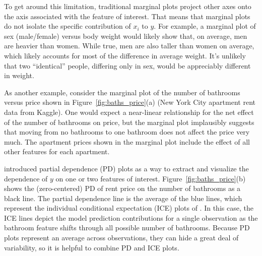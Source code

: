 \documentclass[12pt]{article}
\newcommand{\figref}[1]{Figure~\ref{#1}}
\begin{document}
To get around this limitation, traditional marginal plots project other axes onto the axis associated with the feature of interest.  That means that marginal plots do not isolate the specific contribution of $x_i$ to $y$. For example, a marginal plot of sex (male/female) versus body weight would likely show that, on average, men are heavier than women. While true, men are also taller than women on average, which likely accounts for most of the difference in average weight. It's unlikely that two ``identical'' people, differing only in sex, would be appreciably different in weight.  

As another example, consider the marginal plot of the number of bathrooms versus price shown in \figref{fig:baths_price}(a) (New York City apartment rent data from Kaggle). One would expect a near-linear relationship for the net effect of the number of bathrooms on price, but the marginal plot implausibly suggests that moving from no bathrooms to one bathroom does not affect the price very much.   The apartment prices shown in the marginal plot include the effect of all other features for each apartment.

\cite{PDP} introduced partial dependence (PD) plots as a way to extract and visualize the dependence of $y$ on one or two features of interest. \figref{fig:baths_price}(b) shows the (zero-centered) PD of rent price on the number of bathrooms as a black line. The partial dependence line is the average of the blue lines, which represent the individual conditional expectation (ICE) plots of \cite{ICE}.  In this case, the ICE lines depict the model prediction contributions for a single observation as the bathroom feature shifts through all possible number of bathrooms. Because PD plots represent an average across observations, they can hide a great deal of variability, so it is helpful to combine PD and ICE plots.
\end{document}
